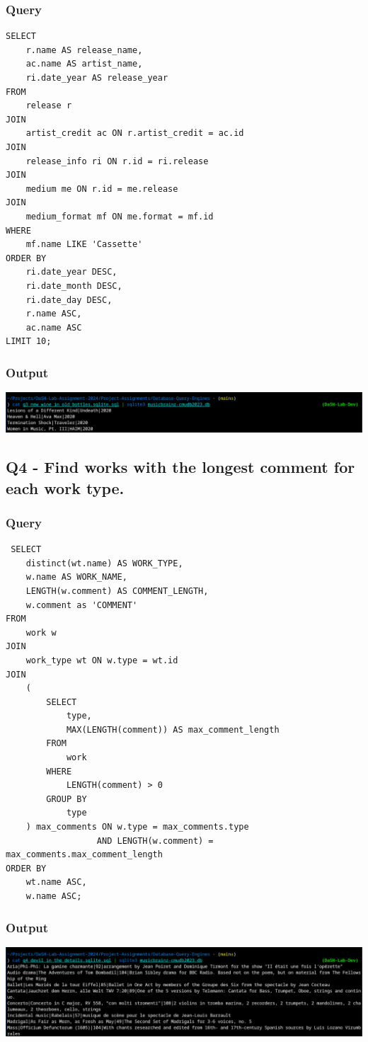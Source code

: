 \documentclass[11pt]{article}
\begin{document}
\subsubsection{Query}
\label{sec:orgd5aee05}
\begin{verbatim}
SELECT
    r.name AS release_name,
    ac.name AS artist_name,
    ri.date_year AS release_year
FROM
    release r
JOIN
    artist_credit ac ON r.artist_credit = ac.id
JOIN
    release_info ri ON r.id = ri.release
JOIN
    medium me ON r.id = me.release
JOIN
    medium_format mf ON me.format = mf.id
WHERE
    mf.name LIKE 'Cassette'
ORDER BY
    ri.date_year DESC,
    ri.date_month DESC,
    ri.date_day DESC,
    r.name ASC,
    ac.name ASC
LIMIT 10;

\end{verbatim}
\subsubsection{Output}
\label{sec:orgb2bbda5}
\begin{center}
\includegraphics[width=.9\linewidth]{./images/Q3.png}
\end{center}
\subsection{Q4 - Find works with the longest comment for each work type.}
\label{sec:orgd0f5606}
\subsubsection{Query}
\label{sec:org85b7e4d}
\begin{verbatim}
 SELECT
    distinct(wt.name) AS WORK_TYPE,
    w.name AS WORK_NAME,
    LENGTH(w.comment) AS COMMENT_LENGTH,
    w.comment as 'COMMENT'
FROM
    work w
JOIN
    work_type wt ON w.type = wt.id
JOIN
    (
        SELECT
            type,
            MAX(LENGTH(comment)) AS max_comment_length
        FROM
            work
        WHERE
            LENGTH(comment) > 0
        GROUP BY
            type
    ) max_comments ON w.type = max_comments.type
                  AND LENGTH(w.comment) = max_comments.max_comment_length
ORDER BY
    wt.name ASC,
    w.name ASC;
\end{verbatim}
\subsubsection{Output}
\label{sec:org311cecc}
\begin{center}
\includegraphics[width=.9\linewidth]{./images/Q4.png}
\end{center}
\end{document}
